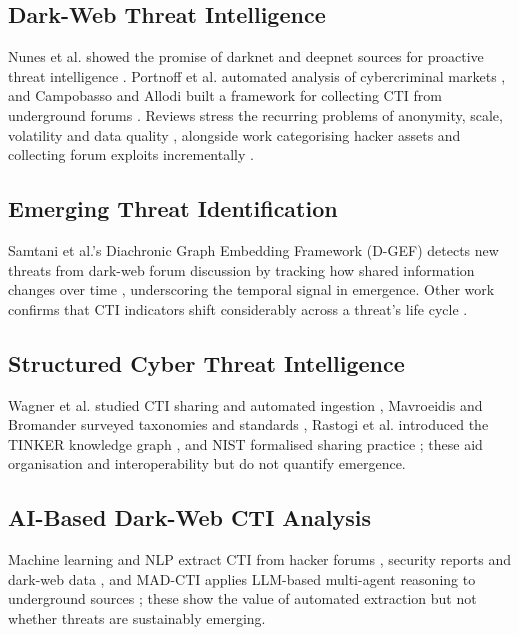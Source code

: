 \documentclass[conference]{IEEEtran}
\begin{document}
\subsection{Dark-Web Threat Intelligence}

Nunes et al. showed the promise of darknet and deepnet sources for proactive threat intelligence \cite{darknet_mining}. Portnoff et al. automated analysis of cybercriminal markets \cite{portnoff}, and Campobasso and Allodi built a framework for collecting CTI from underground forums \cite{threatcrawl}. Reviews stress the recurring problems of anonymity, scale, volatility and data quality \cite{darkweb_evolution, basheer_darkweb_review}, alongside work categorising hacker assets \cite{samtani_hacker_assets} and collecting forum exploits incrementally \cite{williams_incremental}.

\subsection{Emerging Threat Identification}
Samtani et al.'s Diachronic Graph Embedding Framework (D-GEF) detects new threats from dark-web forum discussion by tracking how shared information changes over time \cite{dgef}, underscoring the temporal signal in emergence. Other work confirms that CTI indicators shift considerably across a threat's life cycle \cite{temporal_cti}.
\subsection{Structured Cyber Threat Intelligence}

Wagner et al. studied CTI sharing and automated ingestion \cite{cti_sharing}, Mavroeidis and Bromander surveyed taxonomies and standards \cite{cti_taxonomies}, Rastogi et al. introduced the TINKER knowledge graph \cite{tinker}, and NIST formalised sharing practice \cite{nist_sp800150}; these aid organisation and interoperability but do not quantify emergence.

\subsection{AI-Based Dark-Web CTI Analysis}

Machine learning and NLP extract CTI from hacker forums \cite{ml_hacker_forums}, security reports \cite{automated_extraction} and dark-web data \cite{kadoguchi_darkweb_ml}, and MAD-CTI applies LLM-based multi-agent reasoning to underground sources \cite{madcti}; these show the value of automated extraction but not whether threats are sustainably emerging.
\end{document}
